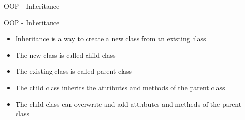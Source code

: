 \documentclass{beamer}
\begin{document}
\begin{frame}{OOP - Inheritance}
{\begin{center}
    \end{center}
    }

\end{frame}

\begin{frame}{OOP - Inheritance}
    \begin{itemize}
        \item Inheritance is a way to create a new class from an existing class
        \item The new class is called child class
        \item The existing class is called parent class
        \item The child class inherits the attributes and methods of the parent class
        \item The child class can overwrite and add attributes and methods of the parent class
    \end{itemize}
\end{frame}
\end{document}
